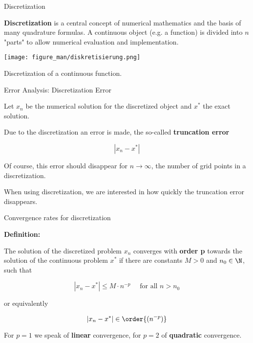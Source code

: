 \documentclass[11pt,compress,t,notes=noshow, xcolor=table]{beamer}
\begin{document}
\begin{vbframe}{Discretization}

\textbf{Discretization} is a central concept of numerical mathematics and the basis of many quadrature formulas. A continuous object (e.g. a function) is divided into $n$ "parts" to allow numerical evaluation and implementation.

\vspace*{0.2cm}

%

\begin{center}
\texttt{[image: figure\_man/diskretisierung.png]}\\
\begin{footnotesize}
Discretization of a continuous function.
\end{footnotesize}
\end{center}

\end{vbframe}

\begin{vbframe}{Error Analysis: Discretization Error}

Let $x_n$ be the numerical solution for the discretized object and $x^*$ the exact solution.

\lz

Due to the discretization an error is made, the so-called \textbf{truncation error}

$$
|x_n - x^*|
$$

Of course, this error should disappear for $n \to \infty$, the number of grid points in a discretization.

\lz

When using discretization, we are interested in how quickly the truncation error disappears.

\end{vbframe}

\begin{vbframe}{Convergence rates for discretization}

\textbf{Definition: }

The solution of the discretized problem $x_n$ converges with \textbf{order p} towards the solution of the continuous problem $x^*$ if there are constants $M > 0$ and $n_0 \in \N$, such that

$$
|x_n - x^*| \le M\cdot n^{-p} \quad \text{ for all } n > n_0
$$

or equivalently

$$
|x_n - x^*| \in \order{(n^{-p})}
$$

For $p = 1$ we speak of \textbf{linear} convergence, for $p = 2$ of \textbf{quadratic} convergence.

\end{vbframe}
\end{document}
